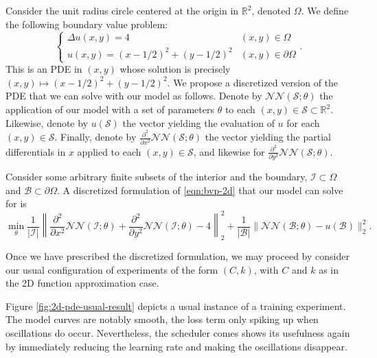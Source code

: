 \documentclass[12pt]{report} %
\begin{document}
Consider the unit radius circle centered at the origin in $\mathbb{R}^2$,
denoted $\Omega$. We define the following boundary value problem:
\begin{equation}
  \left\{\begin{array}{ll}
    \Delta u (x, y) = 4 & (x, y) \in \Omega\\
    u (x, y) = (x - 1 / 2)^2 + (y - 1 / 2)^2 & (x, y) \in \partial \Omega
  \end{array}\right. . \label{eqn:bvp-2d}
\end{equation}
This is an PDE in $(x, y)$ whose solution is precisely $(x, y) \mapsto (x - 1
/ 2)^2 + (y - 1 / 2)^2$. We propose a discretized version of the PDE that we
can solve with our model as follows. Denote by $\mathcal{N}\mathcal{N}
(\mathcal{S}; \theta)$ the application of our model with a set of parameters
$\theta$ to each $(x, y) \in \mathcal{S} \subset \mathbb{R}^2$. Likewise,
denote by $u (\mathcal{S})$ the vector yielding the evaluation of $u$ for each
$(x, y) \in \mathcal{S}$. Finally, denote by $\frac{\partial^2}{\partial x^2}
\mathcal{N}\mathcal{N} (\mathcal{S}; \theta)$ the vector yielding the partial
differentials in $x$ applied to each $(x, y) \in \mathcal{S}$, and likewise
for $\frac{\partial^2}{\partial y^2} \mathcal{N}\mathcal{N} (\mathcal{S};
\theta)$.

Consider some arbitrary finite subsets of the interior and the boundary,
$\mathcal{I} \subset \Omega$ and $\mathcal{B} \subset \partial \Omega$. A
discretized formulation of \eqref{eqn:bvp-2d} that our model can solve for is
\[ \min_{\theta} \frac{1}{| \mathcal{I} |} \left\| \frac{\partial^2}{\partial
   x^2} \mathcal{N}\mathcal{N} (\mathcal{I}; \theta) +
   \frac{\partial^2}{\partial y^2} \mathcal{N}\mathcal{N} (\mathcal{I};
   \theta) - 4 \right\|_2^2 + \frac{1}{| \mathcal{B} |} \|
   \mathcal{N}\mathcal{N} (\mathcal{B}; \theta) - u (\mathcal{B}) \|_2^2 . \]

Once we have prescribed the discretized formulation, we may proceed by consider our usual configuration of experiments of the form $(C,k)$, with $C$ and $k$ as in the 2D function approximation case.

Figure \ref{fig:2d-pde-usual-result} depicts a usual instance of a training experiment. The model curves are notably smooth, the loss term only spiking up when oscillations do occur. Nevertheless, the scheduler comes shows its usefulness again by immediately reducing the learning rate and making the oscillations disappear.
\end{document}
